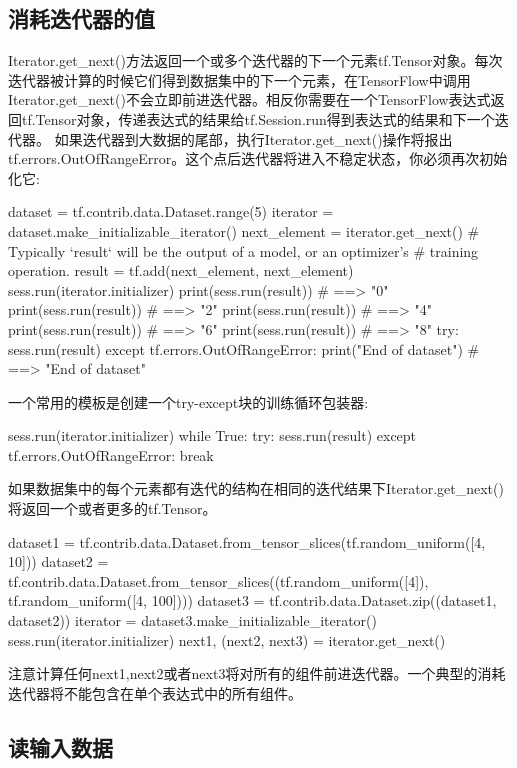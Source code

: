 \subsection{消耗迭代器的值}
Iterator.get\_next()方法返回一个或多个迭代器的下一个元素tf.Tensor对象。每次迭代器被计算的时候它们得到数据集中的下一个元素，在TensorFlow中调用Iterator.get\_next()不会立即前进迭代器。相反你需要在一个TensorFlow表达式返回tf.Tensor对象，传递表达式的结果给tf.Session.run得到表达式的结果和下一个迭代器。
如果迭代器到大数据的尾部，执行Iterator.get\_next()操作将报出tf.errors.OutOfRangeError。这个点后迭代器将进入不稳定状态，你必须再次初始化它:
\begin{python}
dataset = tf.contrib.data.Dataset.range(5)
iterator = dataset.make_initializable_iterator()
next_element = iterator.get_next()
# Typically `result` will be the output of a model, or an optimizer's
# training operation.
result = tf.add(next_element, next_element)
sess.run(iterator.initializer)
print(sess.run(result))  # ==> "0"
print(sess.run(result))  # ==> "2"
print(sess.run(result))  # ==> "4"
print(sess.run(result))  # ==> "6"
print(sess.run(result))  # ==> "8"
try:
    sess.run(result)
except tf.errors.OutOfRangeError:
    print("End of dataset")  # ==> "End of dataset"
\end{python}
一个常用的模板是创建一个try-except块的训练循环包装器:
\begin{python}
sess.run(iterator.initializer)
while True:
    try:
        sess.run(result)
    except tf.errors.OutOfRangeError:
        break
\end{python}
如果数据集中的每个元素都有迭代的结构在相同的迭代结果下Iterator.get\_next()将返回一个或者更多的tf.Tensor。
\begin{python}
dataset1 = tf.contrib.data.Dataset.from_tensor_slices(tf.random_uniform([4, 10]))
dataset2 = tf.contrib.data.Dataset.from_tensor_slices((tf.random_uniform([4]), tf.random_uniform([4, 100])))
dataset3 = tf.contrib.data.Dataset.zip((dataset1, dataset2))
iterator = dataset3.make_initializable_iterator()
sess.run(iterator.initializer)
next1, (next2, next3) = iterator.get_next()
\end{python}
注意计算任何next1,next2或者next3将对所有的组件前进迭代器。一个典型的消耗迭代器将不能包含在单个表达式中的所有组件。
\subsection{读输入数据}
